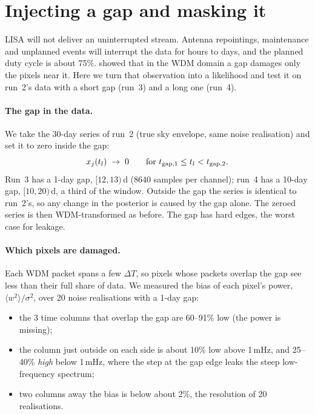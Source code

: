 \documentclass[11pt,a4paper]{article}
\begin{document}
\section{Injecting a gap and masking it}\label{sec:gapmask}

LISA will not deliver an uninterrupted stream. Antenna repointings, maintenance and
unplanned events will interrupt the data for hours to days, and the planned duty
cycle is about 75\%.  showed that in the WDM domain a gap damages only
the pixels near it. Here we turn that observation into a likelihood and test it on
run~2's data with a short gap (run~3) and a long one (run~4).

\paragraph{The gap in the data.} We take the 30-day series of run~2 (true sky envelope,
same noise realisation) and set it to zero inside the gap:
\begin{equation}
  x_j(t_l) \;\to\; 0 \qquad \text{for } t_{\rm gap,1}\le t_l < t_{\rm gap,2}.
  \label{eq:gapzero}
\end{equation}
Run~3 has a 1-day gap, $[12,13)$\,d (8640 samples per channel); run~4 has a 10-day
gap, $[10,20)$\,d, a third of the window. Outside the gap the series is identical to
run~2's, so any change in the posterior is caused by the gap alone. The zeroed series
is then WDM-transformed as before. The gap has hard edges, the worst case for leakage.

\paragraph{Which pixels are damaged.} Each WDM packet spans a few $\Delta T$, so
pixels whose packets overlap the gap see less than their full share of data. We
measured the bias of each pixel's power, $\langle w^2\rangle/\sigma^2$, over 20 noise
realisations with a 1-day gap:
\begin{itemize}
  \item the 3 time columns that overlap the gap are 60--91\% low (the power is
        missing);
  \item the column just outside on each side is about 10\% low above 1\,mHz, and
        25--40\% \emph{high} below 1\,mHz, where the step at the gap edge leaks the
        steep low-frequency spectrum;
  \item two columns away the bias is below about 2\%, the resolution of 20
        realisations.
\end{itemize}
\end{document}
